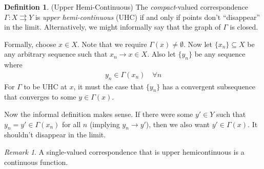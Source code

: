 \documentclass[12pt]{article}
\numberwithin{equation}{section} %
\theoremstyle{plain}
\theoremstyle{definition}
\newtheorem{defn}[thm]{Definition}
\theoremstyle{remark}
\newtheorem*{rmk}{Remark}
\newcommand{\ra}{\rightarrow}
\begin{document}







\begin{defn}{(Upper Hemi-Continuous)}
The \emph{compact}-valued correspondence $\Gamma:X\rightrightarrows Y$
is \emph{upper hemi-continuous} (UHC) if and only if points don't
``disappear'' in the limit. Alternatively, we might informally say that
the graph of $\Gamma$ is closed.

Formally, choose $x\in X$. Note that we require
$\Gamma(x)\neq\emptyset$. Now let $\{x_n\}\subseteq X$ be any arbitrary
sequence such that $x_n\ra x\in X$. Also let $\{y_n\}$ be any sequence
where
\begin{align*}
  y_n \in \Gamma(x_n) \quad\forall n
\end{align*}
For $\Gamma$ to be UHC at $x$, it must the case that $\{y_n\}$ has a
convergent subsequence that converges to some $y\in \Gamma(x)$.

Now the informal definition makes sense. If there were some $y'\in Y$
such that $y_n = y' \in \Gamma(x_n)$ for all $n$ (implying
$y_n\rightarrow y'$), then we also want $y'\in \Gamma(x)$. It shouldn't
disappear in the limit.
\end{defn}
\begin{rmk}
A single-valued correspondence that is upper hemicontinuous is a
continuous function.
\end{rmk}
\end{document}
